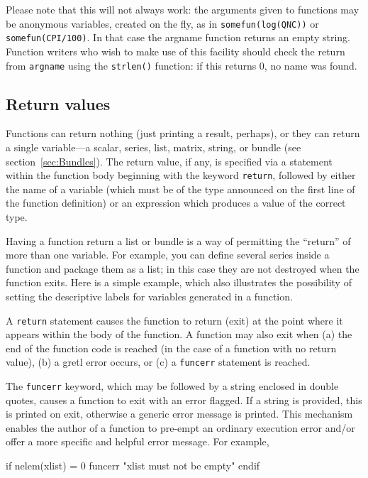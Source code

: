 Please note that this will not always work: the arguments given
to functions may be anonymous variables, created on the fly, as in
\texttt{somefun(log(QNC))} or \texttt{somefun(CPI/100)}.  In that case
the \textsf{argname} function returns an empty string.  Function
writers who wish to make use of this facility should check the return
from \texttt{argname} using the \texttt{strlen()} function: if this
returns 0, no name was found.

\subsection{Return values}

Functions can return nothing (just printing a result, perhaps), or
they can return a single variable---a scalar, series, list, matrix,
string, or bundle (see section~\ref{sec:Bundles}).  The return value,
if any, is specified via a statement within the function body
beginning with the keyword \texttt{return}, followed by either the
name of a variable (which must be of the type announced on the first
line of the function definition) or an expression which produces a
value of the correct type.

Having a function return a list or bundle is a way of permitting the
``return'' of more than one variable.  For example, you can define
several series inside a function and package them as a list; in this
case they are not destroyed when the function exits.  Here is a simple
example, which also illustrates the possibility of setting the
descriptive labels for variables generated in a function.
%    

A \texttt{return} statement causes the function to return (exit) at
the point where it appears within the body of the function.  A
function may also exit when (a) the end of the function code is
reached (in the case of a function with no return value), (b) a
gretl error occurs, or (c) a \verb+funcerr+ statement is
reached.

The \verb+funcerr+ keyword, which may be followed by a string enclosed
in double quotes, causes a function to exit with an error flagged.  If
a string is provided, this is printed on exit, otherwise a generic
error message is printed.  This mechanism enables the author of a
function to pre-empt an ordinary execution error and/or offer a more
specific and helpful error message.  For example,
%
\begin{code}
if nelem(xlist) = 0
   funcerr "xlist must not be empty"
endif
\end{code}

